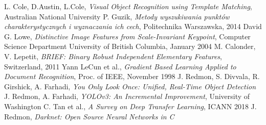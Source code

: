 \documentclass[polish,a4paper]{article}
\begin{document}
\newpage
\begin{thebibliography}{5}
 L. Cole, D.Austin, L.Cole, \emph{Visual Object Recognition using Template Matching}, Australian National University
 P. Guzik, \emph{Metody wyszukiwania punktów charakterystycznych i wyznaczania ich cech}, Politechnika Warszawska, 2014
 David G. Lowe, \emph{Distinctive Image Features from Scale-Invariant Keypoint}, Computer Science Department University of British Columbia, January 2004
 M. Calonder, V. Lepetit, \emph{BRIEF: Binary Robust Independent Elementary Features}, Switzerland, 2011
 Yann LeCun et al., \emph{Gradient Based Learning Applied to Document Recognition}, Proc. of IEEE, November 1998
 J. Redmon, S. Divvala, R. Girshick, A. Farhadi, \emph{You Only Look Once: Unified, Real-Time Object Detection}
 J. Redmon, A. Farhadi, \emph{YOLOv3: An Incremental Improvement}, University of Washington
 C. Tan et al., \emph{A Survey on Deep Transfer Learning}, ICANN 2018
 J. Redmon, \emph{Darknet: Open Source Neural Networks in C}
\end{thebibliography}

\newpage
\tableofcontents{}
\end{document}
